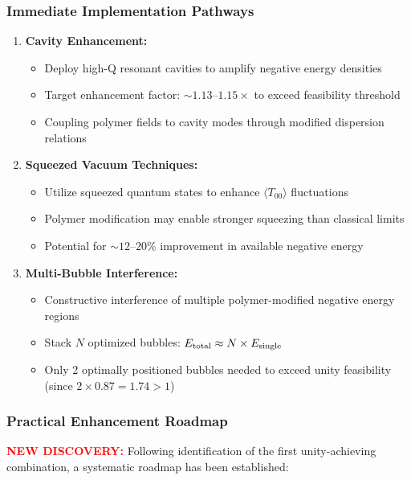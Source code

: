 \documentclass[11pt]{article}
\begin{document}
\subsubsection*{Immediate Implementation Pathways}
\begin{enumerate}  \item \textbf{Cavity Enhancement:}
        \begin{itemize}
          \item Deploy high-Q resonant cavities to amplify negative energy densities
          \item Target enhancement factor: $\sim 1.13\text{--}1.15\times$ to exceed feasibility threshold
          \item Coupling polymer fields to cavity modes through modified dispersion relations
        \end{itemize}

  \item \textbf{Squeezed Vacuum Techniques:}
        \begin{itemize}
          \item Utilize squeezed quantum states to enhance $\langle T_{00} \rangle$ fluctuations
          \item Polymer modification may enable stronger squeezing than classical limits
          \item Potential for $\sim 12\text{--}20\%$ improvement in available negative energy
        \end{itemize}

  \item \textbf{Multi-Bubble Interference:}
        \begin{itemize}
          \item Constructive interference of multiple polymer-modified negative energy regions
          \item Stack $N$ optimized bubbles: $E_{\rm total} \approx N \times E_{\rm single}$
          \item Only 2 optimally positioned bubbles needed to exceed unity feasibility (since $2 \times 0.87 = 1.74 > 1$)
        \end{itemize}
\end{enumerate}

\subsubsection*{Practical Enhancement Roadmap}
\textcolor{red}{\textbf{NEW DISCOVERY:}} Following identification of the first unity-achieving combination, a systematic roadmap has been established:
\end{document}
